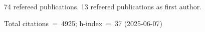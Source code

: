 74 refereed publications. 13 refeered publications as first author.

Total citations~=~4925; h-index~=~37 (2025-06-07)